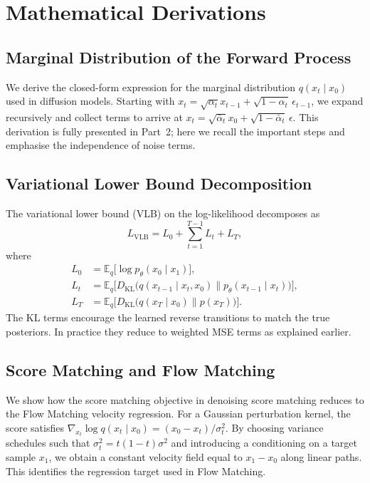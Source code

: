 \section{Mathematical Derivations}

\subsection{Marginal Distribution of the Forward Process}

We derive the closed-form expression for the marginal distribution
$q(x_t\mid x_0)$ used in diffusion models.  Starting with
\(x_t = \sqrt{\alpha_t}x_{t-1} + \sqrt{1-\alpha_t}\,\epsilon_{t-1}\),
we expand recursively and collect terms to arrive at
\(x_t = \sqrt{\bar{\alpha}_t}x_0 + \sqrt{1-\bar{\alpha}_t}\,\epsilon\).
This derivation is fully presented in Part~2; here we recall the
important steps and emphasise the independence of noise terms.

\subsection{Variational Lower Bound Decomposition}

The variational lower bound (VLB) on the log-likelihood decomposes as
\begin{equation}
  L_{\mathrm{VLB}} = L_0 + \sum_{t=1}^{T-1} L_t + L_T,
\end{equation}
where
\begin{align}
  L_0 &= \mathbb{E}_{q}\bigl[\log p_\theta(x_0\mid x_1)\bigr],\\
  L_t &= \mathbb{E}_{q}\bigl[D_{\text{KL}}\bigl(q(x_{t-1}\mid x_t,x_0)\| p_\theta(x_{t-1}\mid x_t)\bigr)\bigr],\\
  L_T &= \mathbb{E}_{q}\bigl[D_{\text{KL}}\bigl(q(x_T\mid x_0)\| p(x_T)\bigr)\bigr].
\end{align}
The KL terms encourage the learned reverse transitions to match the
true posteriors.  In practice they reduce to weighted MSE terms as
explained earlier.

\subsection{Score Matching and Flow Matching}

We show how the score matching objective in denoising score matching
reduces to the Flow Matching velocity regression.  For a Gaussian
perturbation kernel, the score satisfies
\(\nabla_{x_t}\log q(x_t\mid x_0) = (x_0 - x_t)/\sigma_t^2\).  By
choosing variance schedules such that $\sigma_t^2 = t(1-t)\sigma^2$ and
introducing a conditioning on a target sample $x_1$, we obtain a
constant velocity field equal to $x_1 - x_0$ along linear paths.  This
identifies the regression target used in Flow Matching.

